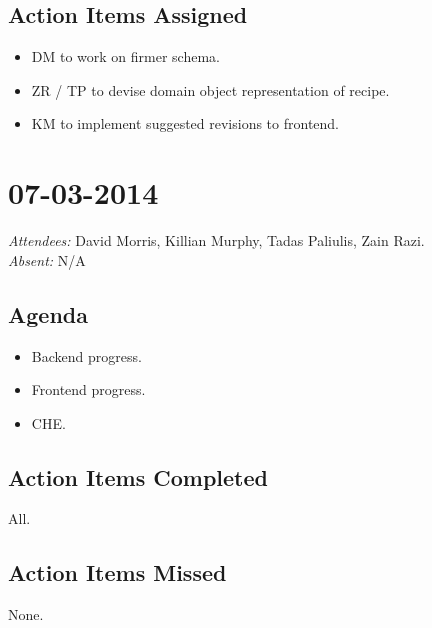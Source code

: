 \documentclass{article}
\begin{document}
\subsection*{Action Items Assigned}
\begin{itemize}
\item DM to work on firmer schema.
\item ZR / TP to devise domain object representation of recipe.
\item KM to implement suggested revisions to frontend.
\end{itemize}


\clearpage

\section*{07-03-2014}
\vspace{0.5cm}
\emph{Attendees: }David Morris, Killian Murphy, Tadas Paliulis, Zain Razi.
\\
\emph{Absent: }N/A

\subsection*{Agenda}
\begin{itemize}
\item Backend progress.
\item Frontend progress.
\item CHE.
\end{itemize}
\subsection*{Action Items Completed}
All.

\subsection*{Action Items Missed}
None.
\end{document}
